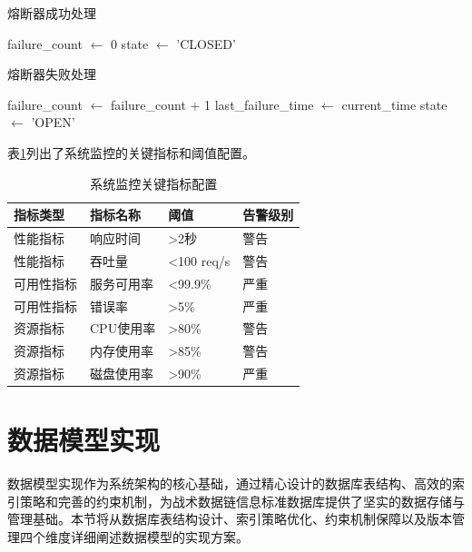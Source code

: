 \begin{algorithm}[H]
\caption{熔断器成功处理}
\begin{algorithmic}[1]
\STATE failure\_count $\leftarrow$ 0
\STATE state $\leftarrow$ 'CLOSED'
\end{algorithmic}
\end{algorithm}

\begin{algorithm}[H]
\caption{熔断器失败处理}
\begin{algorithmic}[1]
\STATE failure\_count $\leftarrow$ failure\_count + 1
\STATE last\_failure\_time $\leftarrow$ current\_time
    \STATE state $\leftarrow$ 'OPEN'
\ENDIF
\end{algorithmic}
\end{algorithm}

表\ref{table:monitoring_metrics}列出了系统监控的关键指标和阈值配置。

\begin{table}[H]
    \caption{系统监控关键指标配置}
    \label{table:monitoring_metrics}
    \centering
    \begin{tabular}{llll}
        \toprule
        \textbf{指标类型} & \textbf{指标名称} & \textbf{阈值} & \textbf{告警级别} \\
        \midrule
        性能指标 & 响应时间 & >2秒 & 警告 \\
        性能指标 & 吞吐量 & <100 req/s & 警告 \\
        可用性指标 & 服务可用率 & <99.9\% & 严重 \\
        可用性指标 & 错误率 & >5\% & 严重 \\
        资源指标 & CPU使用率 & >80\% & 警告 \\
        资源指标 & 内存使用率 & >85\% & 警告 \\
        资源指标 & 磁盘使用率 & >90\% & 严重 \\
        \bottomrule
    \end{tabular}
\end{table}

\section{数据模型实现}

数据模型实现作为系统架构的核心基础，通过精心设计的数据库表结构、高效的索引策略和完善的约束机制，为战术数据链信息标准数据库提供了坚实的数据存储与管理基础。本节将从数据库表结构设计、索引策略优化、约束机制保障以及版本管理四个维度详细阐述数据模型的实现方案。

